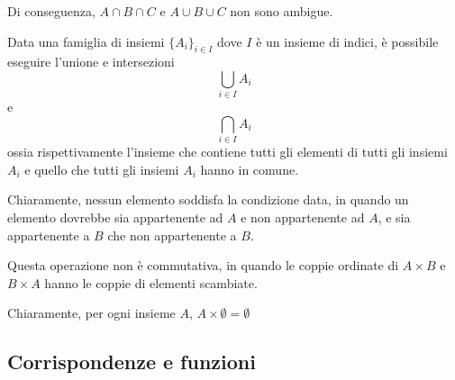\documentclass[a4paper]{article}
\begin{document}
Di conseguenza, \(A \cap B \cap C\) e \(A \cup B \cup C\) non sono ambigue.

Data una famiglia di insiemi \({\{A_i\}}_{i \in I}\) dove \(I\) è un insieme di indici,
è possibile eseguire l'unione e intersezioni
\[
    \bigcup_{i\in I} A_i
\]
e
\[
    \bigcap_{i\in I} A_i
\]
ossia rispettivamente l'insieme che contiene tutti gli elementi di tutti gli insiemi \(A_i\) e quello
che tutti gli insiemi \(A_i\) hanno in comune.


Chiaramente, nessun elemento soddisfa la condizione data,
in quando un elemento dovrebbe sia appartenente ad \(A\) e non appartenente ad \(A\), e
sia appartenente a \(B\) che non appartenente a \(B\).



Questa operazione non è commutativa, in quando le coppie ordinate di \(A \times B\)
e \(B \times A\) hanno le coppie di elementi scambiate.


Chiaramente, per ogni insieme \(A\), \(A \times \emptyset = \emptyset\)

\subsection{Corrispondenze e funzioni}

\end{document}
